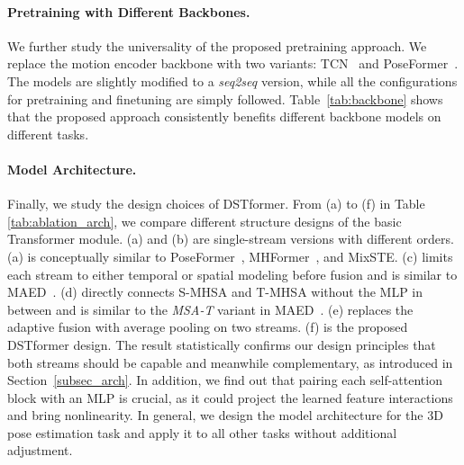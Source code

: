 \paragraph{Pretraining with Different Backbones.} 
We further study the universality of the proposed pretraining approach. We replace the motion encoder backbone with two variants: TCN~\cite{pavllo20193d} and PoseFormer~\cite{zheng20213d}. The models are slightly modified to a \textit{seq2seq} version, while all the configurations for pretraining and finetuning are simply followed. Table~\ref{tab:backbone} shows that the proposed approach consistently benefits different backbone models on different tasks.








\paragraph{Model Architecture.} Finally, we study the design choices of DSTformer. From (a) to (f) in Table \ref{tab:ablation_arch}, we compare different structure designs of the basic Transformer module.  (a) and (b) are single-stream versions with different orders. (a) is conceptually similar to PoseFormer~\cite{zheng20213d}, MHFormer~\cite{li2022mhformer}, and MixSTE\cite{zhang2022mixste}. (c) limits each stream to either temporal or spatial modeling before fusion and is similar to MAED~\cite{wan2021}. (d) directly connects S-MHSA and T-MHSA without the MLP in between and is similar to the \textit{MSA-T} variant in MAED~\cite{wan2021}. (e) replaces the adaptive fusion with average pooling on two streams. (f) is the proposed DSTformer design. 
The result statistically confirms our design principles that both streams should be capable and meanwhile complementary, as introduced in Section~\ref{subsec_arch}. In addition, we find out that pairing each self-attention block with an MLP is crucial, as it could project the learned feature interactions and bring nonlinearity. In general, we design the model architecture for the 3D pose estimation task and apply it to all other tasks without additional adjustment. 


